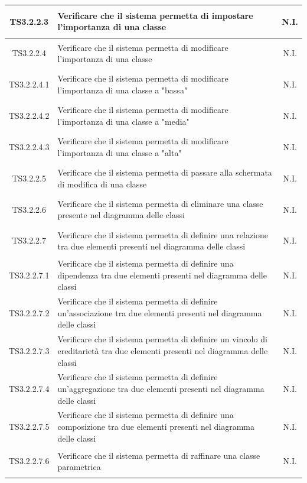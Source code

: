 \documentclass[../PianoDiQualifica.tex]{subfiles}
\begin{document}
\begin{longtable}{|c|>{\centering}p{10cm}|c|}
	\hline
	\hypertarget{TS3.2.2.3}{TS3.2.2.3} & Verificare che il sistema permetta di impostare l'importanza di una classe & N.I. \\
	\hline
	\hypertarget{TS3.2.2.4}{TS3.2.2.4} & Verificare che il sistema permetta di modificare l'importanza di una classe & N.I. \\
	\hline
	\hypertarget{TS3.2.2.4.1}{TS3.2.2.4.1} & Verificare che il sistema permetta di modificare l'importanza di una classe a "bassa" & N.I. \\
	\hline
	\hypertarget{TS3.2.2.4.2}{TS3.2.2.4.2} & Verificare che il sistema permetta di modificare l'importanza di una classe a "media" & N.I. \\
	\hline
	\hypertarget{TS3.2.2.4.3}{TS3.2.2.4.3} & Verificare che il sistema permetta di modificare l'importanza di una classe a "alta" & N.I. \\
	\hline
	\hypertarget{TS3.2.2.5}{TS3.2.2.5} & Verificare che il sistema permetta di passare alla schermata di modifica di una classe & N.I. \\
	\hline
	\hypertarget{TS3.2.2.6}{TS3.2.2.6} & Verificare che il sistema permetta di eliminare una classe presente nel diagramma delle classi & N.I. \\
	\hline
	\hypertarget{TS3.2.2.7}{TS3.2.2.7} & Verificare che il sistema permetta di definire una relazione tra due elementi presenti nel diagramma delle classi & N.I. \\
	\hline
	\hypertarget{TS3.2.2.7.1}{TS3.2.2.7.1} & Verificare che il sistema permetta di definire una dipendenza tra due elementi presenti nel diagramma delle classi & N.I. \\
	\hline
	\hypertarget{TS3.2.2.7.2}{TS3.2.2.7.2} & Verificare che il sistema permetta di definire un'associazione tra due elementi presenti nel diagramma delle classi & N.I. \\
	\hline
	\hypertarget{TS3.2.2.7.3}{TS3.2.2.7.3} & Verificare che il sistema permetta di definire un vincolo di ereditarietà tra due elementi presenti nel diagramma delle classi & N.I. \\
	\hline
	\hypertarget{TS3.2.2.7.4}{TS3.2.2.7.4} & Verificare che il sistema permetta di definire un'aggregazione tra due elementi presenti nel diagramma delle classi & N.I. \\
	\hline
	\hypertarget{TS3.2.2.7.5}{TS3.2.2.7.5} & Verificare che il sistema permetta di definire una composizione tra due elementi presenti nel diagramma delle classi & N.I. \\
	\hline
	\hypertarget{TS3.2.2.7.6}{TS3.2.2.7.6} & Verificare che il sistema permetta di raffinare una classe parametrica & N.I. \\

\end{longtable}
\end{document}
